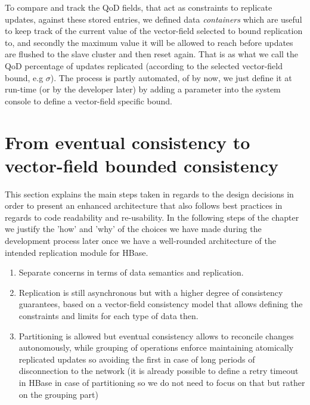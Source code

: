 To compare and track the QoD fields, that act as constraints to replicate updates, against these stored entries, we defined data \emph{containers} which are useful to keep track of the current value of the vector-field selected to bound replication to, and secondly the maximum value it will be allowed to reach before updates are flushed to the slave cluster and then reset again. That is as what we call the QoD percentage of updates replicated (according to the selected vector-field bound, e.g $\sigma$). The process is partly automated, of by now, we just define it at run-time (or by the developer later) by adding a parameter into the system console to define a vector-field specific bound.

\section{From eventual consistency to vector-field bounded consistency}\label{architecture:requirements}
This section explains the main steps taken in regards to the design decisions in order to present an enhanced architecture that also follows best practices in regards to code readability and re-usability. In the following steps of the chapter we justify the 'how' and 'why' of the choices we have made during the development process later once we have a well-rounded architecture of the intended replication module for HBase.

\begin{enumerate}
\item Separate concerns in terms of data semantics and replication.
\item Replication is still asynchronous but with a higher degree of consistency guarantees, based on a vector-field consistency model that allows defining the constraints and limits for each type of data then.
\item Partitioning is allowed but eventual consistency allows to reconcile changes autonomously, while grouping of operations enforce maintaining atomically replicated updates so avoiding the first in case of long periods of disconnection to the network (it is already possible to define a retry timeout in HBase in case of partitioning so we do not need to focus on that but rather on the grouping part)
\end{enumerate}

